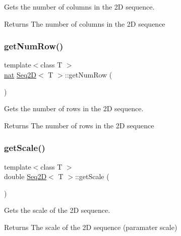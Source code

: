 Gets the number of columns in the 2D sequence. 

\begin{DoxyReturn}{Returns}
The number of columns in the 2D sequence 
\end{DoxyReturn}
\mbox{\label{class_seq2_d_acd9009bd107c4408a10baf540aa69858}} 
\subsubsection{\texorpdfstring{get\+Num\+Row()}{getNumRow()}}
{\footnotesize\ttfamily template$<$class T $>$ \\
\mbox{\hyperlink{_path_a_d_t_8h_a56638ee9d162e8cce3a15f92d2023d6e}{nat}} \mbox{\hyperlink{class_seq2_d}{Seq2D}}$<$ T $>$\+::get\+Num\+Row (\begin{DoxyParamCaption}{ }\end{DoxyParamCaption})}



Gets the number of rows in the 2D sequence. 

\begin{DoxyReturn}{Returns}
The number of rows in the 2D sequence 
\end{DoxyReturn}
\mbox{\label{class_seq2_d_a6d4fe7251d0867677d6a84a7c3fbb959}} 
\subsubsection{\texorpdfstring{get\+Scale()}{getScale()}}
{\footnotesize\ttfamily template$<$class T $>$ \\
double \mbox{\hyperlink{class_seq2_d}{Seq2D}}$<$ T $>$\+::get\+Scale (\begin{DoxyParamCaption}{ }\end{DoxyParamCaption})}



Gets the scale of the 2D sequence. 

\begin{DoxyReturn}{Returns}
The scale of the 2D sequence (paramater scale) 
\end{DoxyReturn}
\mbox{\label{class_seq2_d_ac950d78724ce1154292628c87596ac69}} 
